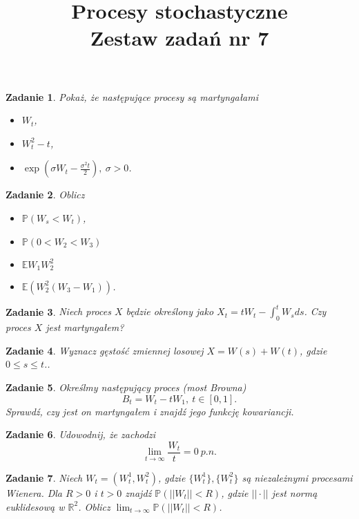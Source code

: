 \documentclass{mwart}
\title{Procesy stochastyczne\\ Zestaw zadań nr 7}
\newtheorem{zd}{Zadanie}
\begin{document}

\maketitle
\begin{zd}
	Pokaż, że następujące procesy są martyngałami
	\begin{itemize}
		\item $W_t$,
		\item $W_t^2 - t$,
		\item $\exp\left(\sigma W_t - \frac{\sigma^2t}{2}\right),\ \sigma > 0$.
	\end{itemize}
\end{zd}
\begin{zd}
	Oblicz
	\begin{itemize}
		\item $\mathbb{P}(W_s < W_t)$,
		\item $\mathbb{P}(0 < W_2 < W_3)$
		\item $\mathbb{E}W_1W_2^2$
		\item $\mathbb{E}\left(W_2^2(W_3 - W_1)\right)$.
	\end{itemize}
\end{zd}

\begin{zd}
Niech proces $X$ będzie określony jako $X_t = tW_t - \int_0^tW_sds$. Czy proces $X$ jest martyngałem?
\end{zd}

\begin{zd}
Wyznacz gęstość zmiennej losowej $X = W(s) + W(t)$, gdzie $0\leq s\leq t$..
\end{zd}

\begin{zd}
	Określmy następujący proces (most Browna)
	\begin{displaymath}
		B_t = W_t - tW_1, \ t\in[0,1].
	\end{displaymath}
	Sprawdź, czy jest on martyngałem i znajdź jego funkcję kowariancji.
\end{zd}
\begin{zd}
	Udowodnij, że zachodzi
	\begin{displaymath}
	\lim_{t \to \infty}\frac{W_t}{t} = 0\ p.n.
	\end{displaymath}
\end{zd}
\begin{zd}
	Niech $W_t = (W_t^1, W_t^2)$, gdzie $\{W_t^1\}, \{W_t^2\}$ są niezależnymi procesami Wienera. Dla $R > 0$ i $t > 0$ znajdź $\mathbb{P}\left(||W_t|| < R	\right)$, gdzie $||\cdot||$ jest normą euklidesową w $\mathbb{R}^2$. Oblicz $\lim_{t \to \infty}\mathbb{P}\left(||W_t|| < R	\right)$.
\end{zd}
\end{document}
